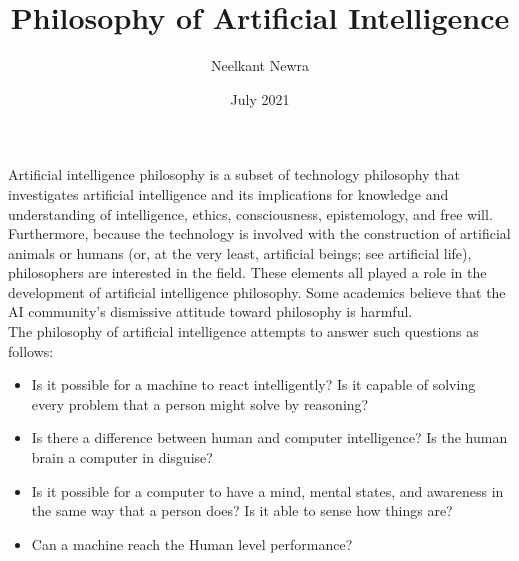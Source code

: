 \documentclass{article}
\title{\vspace{-3cm}Philosophy of Artificial Intelligence}
\author{Neelkant Newra}
\date{July 2021}
\begin{document}
\maketitle
Artificial intelligence philosophy is a subset of technology philosophy that investigates artificial intelligence and its implications for knowledge and understanding of intelligence, ethics, consciousness, epistemology, and free will. Furthermore, because the technology is involved with the construction of artificial animals or humans (or, at the very least, artificial beings; see artificial life), philosophers are interested in the field. These elements all played a role in the development of artificial intelligence philosophy. Some academics believe that the AI community's dismissive attitude toward philosophy is harmful.\\

The philosophy of artificial intelligence attempts to answer such questions as follows:
\begin{itemize}
	\item Is it possible for a machine to react intelligently? Is it capable of solving every problem that a person might solve by reasoning?

	\item Is there a difference between human and computer intelligence? Is the human brain a computer in disguise?

	\item Is it possible for a computer to have a mind, mental states, and awareness in the same way that a person does? Is it able to sense how things are?
	
	\item Can a machine reach the Human level performance?

\end{itemize}
\end{document}

